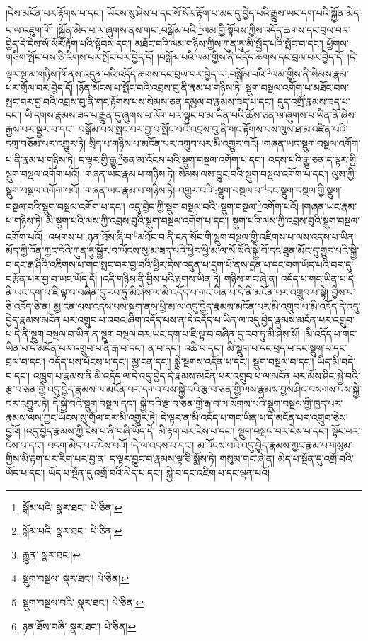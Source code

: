 །དེས་མངོན་པར་རྟོགས་པ་དང་། ཡོངས་སུ་ཤེས་པ་དང་སོ་སོར་རྟོག་པ་མང་དུ་བྱེད་པའི་རྒྱུས་ཡང་དག་པའི་སྐྱོན་མེད་པ་ལ་འཇུག་གོ། །སྐྱོན་མེད་པ་ལ་ཞུགས་ནས་གང་:བསྒོམ་པའི་\footnote{སྒོམ་པའི་  སྣར་ཐང་།  པེ་ཅིན། }ལམ་གྱི་སྟོབས་ཀྱིས་འདོད་ཆགས་དང་བྲལ་བར་བྱེད་དེ་དེས་སོ་སོར་རྟོག་པའི་སྟོབས་དང་། མཐོང་བའི་ལམ་གཉིས་ཀྱིས་ཀུན་ཏུ་མི་སྤྱོད་པའི་སྤོང་བ་དང་། ཕྱོགས་གཅིག་སྤོང་བས་ཅི་རིགས་པར་སྤོང་བར་བྱེད་དོ། །བསྒོམ་པའི་ལམ་གྱིས་ནི་འདོད་ཆགས་དང་བྲལ་བར་བྱེད་དོ། །དེ་ལྟར་སྔ་མ་གཉིས་ཁོ་ནས་འདུན་པའི་འདོད་ཆགས་དང་བྲལ་བར་བྱེད་ལ་:བསྒོམ་པའི་\footnote{སྒོམ་པའི་  སྣར་ཐང་།  པེ་ཅིན། }ལམ་གྱིས་ནི་སེམས་རྣམ་པར་གྲོལ་བར་བྱེད་དོ། །ཉོན་མོངས་པ་སྤོང་བའི་འབྲས་བུ་ནི་རྣམ་པ་གཉིས་ཏེ། སྡུག་བསྔལ་འགོག་པ་མཐོང་བས་སྤང་བར་བྱ་བའི་འབྲས་བུ་ནི་གང་རྟོགས་པས་སེམས་ཅན་དམྱལ་བ་རྣམས་ཟད་པ་དང་། དུད་འགྲོ་རྣམས་ཟད་པ་དང་། ཡི་དགས་རྣམས་ཟད་པ་རྒྱུན་དུ་ཞུགས་པ་ལོག་པར་ལྟུང་བ་མ་ཡིན་པའི་ཆོས་ཅན་ལ་ཞུགས་པ་ཡིན་ནོ་ཞེས་རྒྱས་པར་སྦྱར་བ་དང་། བསྒོམ་པས་སྤང་བར་བྱ་བ་སྤོང་བའི་འབྲས་བུ་ནི་གང་རྟོགས་པས་ལུས་ཐ་མ་འཛིན་པའི་དགྲ་བཅོམ་པར་འགྱུར་ཏེ། སྲིད་པ་གཉིས་པ་མངོན་པར་འགྲུབ་པར་མི་འགྱུར་བའོ། །གཞན་ཡང་སྡུག་བསྔལ་འགོག་པ་ནི་རྣམ་པ་གཉིས་ཏེ། ད་ལྟར་གྱི་རྒྱུ་\footnote{རྒྱུན་  སྣར་ཐང་། }ཅན་མ་འོངས་པའི་སྡུག་བསྔལ་འགོག་པ་དང་། འདས་པའི་རྒྱུ་ཅན་ད་ལྟར་གྱི་སྡུག་བསྔལ་འགོག་པའོ། །གཞན་ཡང་རྣམ་པ་གཉིས་ཏེ། སེམས་ལས་བྱུང་བའི་སྡུག་བསྔལ་འགོག་པ་དང་། ལུས་ཀྱི་སྡུག་བསྔལ་འགོག་པའོ། །གཞན་ཡང་རྣམ་པ་གཉིས་ཏེ། འགྱུར་བའི་:སྡུག་བསྔལ་བ་\footnote{སྡུག་བསྔལ་  སྣར་ཐང་།  པེ་ཅིན། }དང་སྡུག་བསྔལ་གྱི་སྡུག་བསྔལ་བའི་སྡུག་བསྔལ་འགོག་པ་དང་། འདུ་བྱེད་ཀྱི་སྡུག་བསྔལ་བའི་:སྡུག་བསྔལ་\footnote{སྡུག་བསྔལ་བའི་  སྣར་ཐང་།  པེ་ཅིན། }འགོག་པའོ། །གཞན་ཡང་རྣམ་པ་གཉིས་ཏེ། མི་སྡུག་པའི་ལས་ཀྱི་འབྲས་བུའི་སྡུག་བསྔལ་འགོག་པ་དང་། སྡུག་པའི་ལས་ཀྱི་འབྲས་བུའི་སྡུག་བསྔལ་འགོག་པའོ། །འཕགས་པ་:ཉན་ཐོས་ཞི་བ་\footnote{ཉན་ཐོས་བཞི་  སྣར་ཐང་།  པེ་ཅིན། }མཐོང་བ་ནི་ངན་སོང་གི་སྡུག་བསྔལ་གྱི་འཇིགས་པ་ལས་འདས་པ་ཡིན་མོད་ཀྱི་འོན་ཀྱང་དེའི་ཀུན་ཏུ་སྦྱོར་བ་ཡོངས་སུ་མ་ཟད་པའི་ཕྱིར་ཕྱི་མ་ལ་སོ་སོའི་སྐྱེ་བོ་དང་ཐུན་མོང་དུ་གྱུར་པའི་སྐྱེ་བ་དང་རྒ་ཤིའི་འཇིགས་པ་གང་སྤང་བར་བྱ་བའི་ཕྱིར་དེས་འདུན་པ་དྲག་པོ་ནས་དྲན་པ་དང་བག་ཡོད་པའི་བར་དུ་བརྩོན་པར་བྱ་བ་ཡང་ཡོད་དོ། །འདི་གཉིས་ནི་བྱིས་པའི་རྟགས་ཡིན་ཏེ། གཉིས་གང་ཞེ་ན། འདོད་པ་གང་ཡིན་པ་དེ་ནི་ཡང་དག་པ་ཇི་ལྟ་བ་བཞིན་དུ་རབ་ཏུ་མི་ཤེས་ལ་མི་འདོད་པ་གང་ཡིན་པ་དེ་ནི་མངོན་པར་འགྲུབ་པ་སྟེ། བྱིས་པ་ཅི་འདོད་ཅེ་ན། མྱ་ངན་ལས་འདས་པས་སྐྲག་ནས་ཕྱི་མ་ལ་འདུ་བྱེད་རྣམས་མངོན་པར་མི་འགྲུབ་པ་མི་འདོད་དེ་འདུ་བྱེད་རྣམས་མངོན་པར་འགྲུབ་པ་འབའ་ཞིག་འདོད་པས་ན་དེ་འདོད་པ་ཡིན་ལ་འདུ་བྱེད་རྣམས་མངོན་པར་འགྲུབ་པ་དེ་ནི་སྡུག་བསྔལ་བ་ཡིན་ན་སྡུག་བསྔལ་བར་ཡང་དག་པ་ཇི་ལྟ་བ་བཞིན་དུ་རབ་ཏུ་མི་ཤེས་སོ། །མི་འདོད་པ་གང་ཡིན་པ་དེ་མངོན་པར་འགྲུབ་པ་ནི་རྒ་བ་དང་། ན་བ་དང་། འཆི་བ་དང་། མི་སྡུག་པ་དང་ཕྲད་པ་དང་སྡུག་པ་དང་བྲལ་བ་དང་། འདོད་པས་ཕོངས་པ་དང་། མྱ་ངན་དང་། སྨྲེ་སྔགས་འདོན་པ་དང་། སྡུག་བསྔལ་བ་དང་། ཡིད་མི་བདེ་བ་དང་། འཁྲུག་པ་རྣམས་ནི་མི་འདོད་ལ་དེ་འདུ་བྱེད་དེ་རྣམས་མངོན་པར་འགྲུབ་པ་ལ་མངོན་པར་མོས་ཤིང་སྐྱེ་བའི་རྩ་བ་ཅན་གྱི་འདུ་བྱེད་རྣམས་ལ་མངོན་པར་དགའ་བས་སྐྱེ་བའི་རྩ་བ་ཅན་གྱི་ལས་རྣམས་བྱས་ཤིང་བསགས་པས་སྐྱེ་བར་འགྱུར་ཏེ། དེ་སྐྱེ་བའི་སྡུག་བསྔལ་དང་། སྐྱེ་བའི་རྩ་བ་ཅན་གྱི་རྒ་བ་ལ་སོགས་པའི་སྡུག་བསྔལ་གྱི་ཁྱད་པར་རྣམས་ལས་ཀྱང་ཡོངས་སུ་གྲོལ་བར་མི་འགྱུར་ཏེ། དེ་ལྟར་ན་མི་འདོད་པ་གང་ཡིན་པ་དེ་མངོན་པར་འགྲུབ་ཅེས་བྱའོ། །འདུ་བྱེད་རྣམས་ཀྱི་ངེས་པ་ནི་བཞི་ཡོད་དེ། མི་རྟག་པར་ངེས་པ་དང་། སྡུག་བསྔལ་བར་ངེས་པ་དང་། སྟོང་པར་ངེས་པ་དང་། བདག་མེད་པར་ངེས་པའོ། །དེ་ལ་འདས་པ་དང་། མ་འོངས་པའི་འདུ་བྱེད་རྣམས་ཀྱང་རྣམ་པ་གསུམ་གྱིས་མི་རྟག་པར་རིག་པར་བྱ་ན། ད་ལྟར་བྱུང་བ་རྣམས་ལྟ་ཅི་སྨོས་ཏེ། གསུམ་གང་ཞེ་ན། མེད་པ་སྔོན་དུ་འགྲོ་བའི་ཡོད་པ་དང་། ཡོད་པ་སྔོན་དུ་འགྲོ་བའི་མེད་པ་དང་། སྐྱེ་བ་དང་འཇིག་པ་དང་ལྡན་པའོ། 